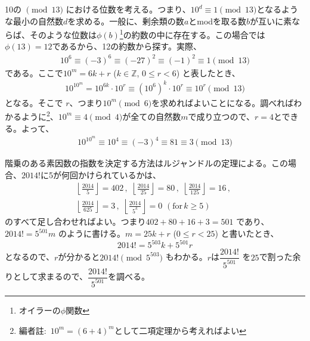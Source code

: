 10の $\pmod{13}$ における位数を考える。つまり、$10^d\equiv 1 \pmod{13}$となるような最小の自然数$d$を求める。一般に、剰余類の数$a$とmodを取る数$b$が互いに素ならば、そのような位数は$\phi (b)$\footnote{オイラーの$\phi$関数}の約数の中に存在する。この場合では$\phi(13)=12$であるから、12の約数から探す。実際、
\begin{align*}
 10^6\equiv (-3)^6\equiv (-27)^2\equiv (-1)^2\equiv 1 \pmod{13}
\end{align*}
である。ここで$10^m=6k+r$ ($k\in\mathbb{Z}$, $0\le r < 6$) と表したとき、
\begin{align*}
 10^{10^m}=10^{6k}\cdot 10^r\equiv (10^6)^k\cdot 10^r\equiv 10^r \pmod{13}
\end{align*}
となる。そこで $r$、つまり$10^m \pmod{6}$を求めればよいことになる。調べればわかるように\footnote{編者註:~$10^m=(6+4)^m$として二項定理から考えればよい}、$10^m\equiv 4 \pmod{4}$が全ての自然数$m$で成り立つので、$r=4$とできる。よって、
\begin{align*}
 10^{10^m}\equiv 10^4 \equiv (-3)^4\equiv 81\equiv 3 \pmod{13}
\end{align*}

階乗のある素因数の指数を決定する方法はルジャンドルの定理による。この場合、$2014!$に5が何回かけられているかは、
\begin{align*}
 \left\lfloor\frac{2014}{5}\right\rfloor=402 \,,\,\, \left\lfloor\frac{2014}{25}\right\rfloor=80 \,,\,\, \left\lfloor\frac{2014}{125}\right\rfloor=16 \,,\,\, \\
 \left\lfloor\frac{2014}{625}\right\rfloor=3 \,,\,\, \left\lfloor\frac{2014}{5^k}\right\rfloor=0 \,\,(\text{for}\,k\ge 5)
\end{align*}
のすべて足し合わせればよい。つまり$402+80+16+3=501$ であり、$2014!=5^{501}m$ のように書ける。$m=25k+r$ ($0\le r < 25$) と書いたとき、
\[ 2014!=5^{503}k+5^{501}r \]
となるので、$r$が分かると$2014! \pmod{5^{503}}$ もわかる。$r$は$\dfrac{2014!}{5^{501}}$ を$25$で割った余りとして求まるので、$\dfrac{2014!}{5^{501}}$を調べる。

